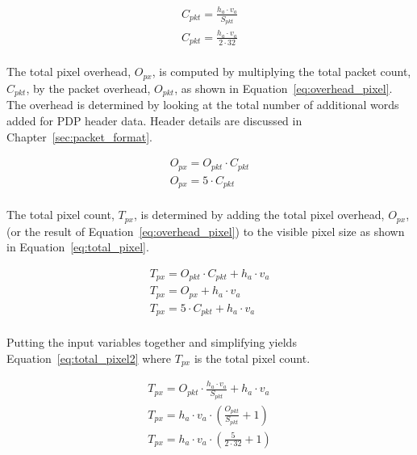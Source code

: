     \begin{equation}
        \begin{array}{ l }
            \displaystyle C_{pkt}=\frac{h_a \cdot v_a}{S_{pkt}} \\[13pt]
            \displaystyle C_{pkt}=\frac{h_a \cdot v_a}{2 \cdot 32}\\[13pt]
        \end{array}
        \label{eq:packet_max}
    \end{equation}

    The total pixel overhead, $O_{px}$, is computed by multiplying the total packet count, $C_{pkt}$, by the packet overhead, $O_{pkt}$, as shown in Equation~\eqref{eq:overhead_pixel}. The overhead is determined by looking at the total number of additional words added for PDP header data. Header details are discussed in Chapter~\ref{sec:packet_format}.

    \begin{equation}
        \begin{array}{ l }
            \displaystyle O_{px}=O_{pkt} \cdot C_{pkt} \\
            \displaystyle O_{px}=5\cdot C_{pkt} \\[13pt]
        \end{array}
        \label{eq:overhead_pixel}
    \end{equation}

    The total pixel count, $T_{px}$, is determined by adding the total pixel overhead, $O_{px}$, (or the result of Equation~\eqref{eq:overhead_pixel}) to the visible pixel size as shown in Equation~\eqref{eq:total_pixel}.

    \begin{equation}
        \begin{array}{ l }
            \displaystyle T_{px}=O_{pkt} \cdot C_{pkt} + h_a \cdot v_a \\
            \displaystyle T_{px}=O_{px} + h_a \cdot v_a \\
            \displaystyle T_{px}=5\cdot C_{pkt} + h_a \cdot v_a \\[13pt]
        \end{array}
        \label{eq:total_pixel}
    \end{equation}

    Putting the input variables together and simplifying yields Equation~\eqref{eq:total_pixel2} where $T_{px}$ is the total pixel count.

    \begin{equation}
        \begin{array}{ l }
            \displaystyle T_{px}=O_{pkt} \cdot \frac{h_a \cdot v_a}{S_{pkt}} + h_a \cdot v_a \\[13pt]
            \displaystyle T_{px}=h_a \cdot v_a \cdot (\frac{O_{pkt}}{S_{pkt}} + 1) \\[13pt]
            \displaystyle T_{px}=h_a \cdot v_a \cdot (\frac{5}{2 \cdot 32} + 1) \\[13pt]
        \end{array}
        \label{eq:total_pixel2}
    \end{equation}

